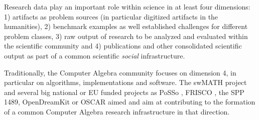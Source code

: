 \documentclass[a4paper,11pt]{article}
\begin{document}
Research data play an important role within science in at least four
dimensions: 1) artifacts as problem sources (in particular digitized artifacts
in the humanities), 2) benchmark examples as well established challenges for
different problem classes, 3) raw output of research to be analyzed and
evaluated within the scientific community and 4) publications and other
consolidated scientific output as part of a common scientific \emph{social}
infrastructure.

Traditionally, the Computer Algebra community focuses on dimension 4, in
particular on algorithms, implementations and software.  The swMATH project
\cite{swmath} and several big national or EU funded projects as PoSSo
\cite{PoSSo}, FRISCO \cite{FRISCO}, the SPP 1489, OpenDreamKit \cite{odk} or
OSCAR \cite{oscar} aimed and aim at contributing to the formation of a common
Computer Algebra research infrastructure in that direction.
\end{document}
